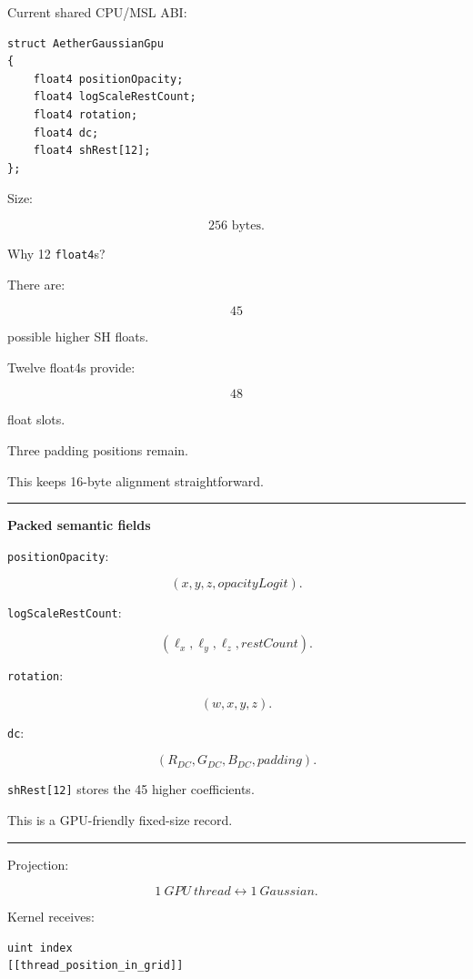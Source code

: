 Current shared CPU/MSL ABI:

\protect{}\label{zxyqtm}%
\begin{verbatim}
struct AetherGaussianGpu
{
    float4 positionOpacity;
    float4 logScaleRestCount;
    float4 rotation;
    float4 dc;
    float4 shRest[12];
};
\end{verbatim}

Size:

\[
\boxed{256\text{ bytes}.}
\]

Why 12 \texttt{float4}s?

There are:

\[
45
\]

possible higher SH floats.

Twelve float4s provide:

\[
48
\]

float slots.

Three padding positions remain.

This keeps 16-byte alignment straightforward.

\begin{center}\rule{0.5\linewidth}{0.5pt}\end{center}

\textbf{Packed semantic fields}

\texttt{positionOpacity}:

\[
(x,y,z,opacityLogit).
\]

\texttt{logScaleRestCount}:

\[
(\ell_x,\ell_y,\ell_z,restCount).
\]

\texttt{rotation}:

\[
(w,x,y,z).
\]

\texttt{dc}:

\[
(R_{DC},G_{DC},B_{DC},padding).
\]

\texttt{shRest{[}12{]}} stores the 45 higher coefficients.

This is a GPU-friendly fixed-size record.

\begin{center}\rule{0.5\linewidth}{0.5pt}\end{center}

Projection:

\[
\boxed{
1\ GPU\ thread
\leftrightarrow
1\ Gaussian.
}
\]

Kernel receives:

\begin{verbatim}
uint index
[[thread_position_in_grid]]
\end{verbatim}

